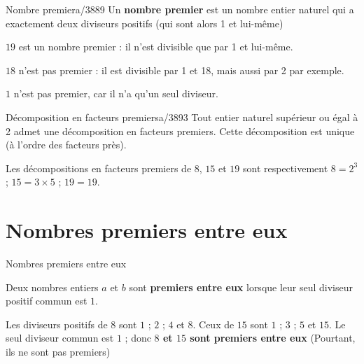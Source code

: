 \begin{pageCours}
\begin{minipage}{0.5\linewidth}
\begin{DefTQ}{Nombre premier}{a/3889}
Un \textbf{nombre premier} est un nombre entier naturel qui a exactement deux diviseurs positifs (qui sont alors 1 et lui-même) 

\end{DefTQ}
\end{minipage}
\begin{minipage}{0.5\linewidth}
\begin{Ex} 

  $19$ est un nombre premier :  il n'est divisible que par 1 et lui-même.

  $18$ n'est pas premier : il est divisible par 1 et 18, mais aussi par 2
  par exemple.
  
  $1$ n'est pas premier, car il n'a qu'un seul diviseur.  
\end{Ex}
\end{minipage}



\begin{minipage}{0.5\linewidth}
  \begin{ThTQ}{Décomposition en facteurs premiers}{a/3893}\label{theo:DFP}
    Tout entier naturel supérieur ou égal à 2 admet une décomposition en facteurs premiers. Cette décomposition est unique (à l'ordre des facteurs près).
    
  \end{ThTQ}
\end{minipage}
\begin{minipage}{0.5\linewidth}
\begin{Exs}
Les décompositions en facteurs premiers de $8$, $15$ et $19$ sont respectivement  
$8=2^3$ ; $15=3 \times 5$ ; $19=19$.
  
\end{Exs}
\end{minipage}




\section{Nombres premiers entre eux}

\begin{minipage}{0.5\linewidth}
  \begin{DefTQ}{Nombres premiers entre eux}{}

    Deux nombres entiers $a$ et $b$ sont \textbf{premiers entre eux}
    lorsque leur seul diviseur positif commun est $1$.
  \end{DefTQ}
\end{minipage}
\begin{minipage}{0.5\linewidth}
\begin{Ex}
  Les diviseurs positifs de $8$ sont $1$ ; $2$ ; $4$ et $8$. Ceux de $15$ sont
  $1$ ; $3$ ; $5$ et $15$. Le seul diviseur commun est $1$ ; donc \textbf{$8$ et $15$ sont premiers entre eux} (Pourtant, ils ne sont pas premiers)
\end{Ex}
\end{minipage}



\end{pageCours}
